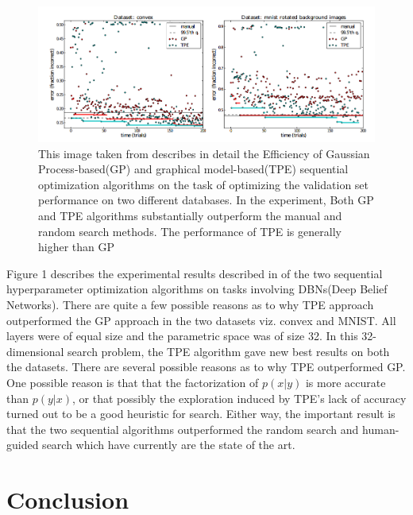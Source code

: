 \documentclass[twoside]{article}
\begin{document}
\begin{itemize}
\begin{figure}
	\includegraphics[width =\linewidth]{TPE.png}
    \caption{This image taken from \cite{bergstra2012random} describes in detail the Efficiency of Gaussian Process-based(GP) and graphical model-based(TPE) sequential optimization algorithms on the task of optimizing the validation set performance on two different databases. In the experiment, Both GP and TPE algorithms substantially outperform the manual and random search methods. The performance of TPE is generally higher than GP}
    \label{fig:fig1}
\end{figure}



Figure 1 describes the experimental results described in \cite{bergstra2012random} of the two sequential hyperparameter optimization algorithms on tasks involving DBNs(Deep Belief Networks). There are quite a few possible reasons as to why TPE approach outperformed the GP approach in the two datasets viz. convex and MNIST. All layers were of equal size and the parametric space was of size 32. In this 32-dimensional search problem, the TPE algorithm gave new best results on both the datasets. There are several possible reasons as to why TPE outperformed GP. One possible reason is that that the factorization of $p(x|y)$ is more accurate than $p(y|x)$, or that possibly the exploration induced by TPE's lack of accuracy turned out to be a good heuristic for search. Either way, the important result is that the two sequential algorithms outperformed the random search and human-guided search which have currently are the state of the art.\cite{bergstra2012random}

\end{itemize}

\section{Conclusion}
\end{document}
